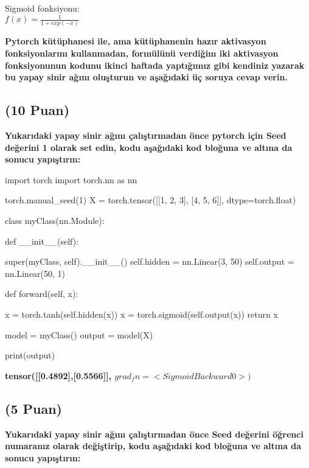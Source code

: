 \documentclass[11pt]{article}
\begin{document}
Sigmoid fonksiyonu:\\
$f(x) = \frac{1}{1 + exp(-x)}$

\vspace{.2in}
 \textbf{Pytorch kütüphanesi ile, ama kütüphanenin hazır aktivasyon fonksiyonlarını kullanmadan, formülünü verdiğim iki aktivasyon fonksiyonunun kodunu ikinci haftada yaptığımız gibi kendiniz yazarak bu yapay sinir ağını oluşturun ve aşağıdaki üç soruya cevap verin.}
 
\subsection{(10 Puan)} \textbf{Yukarıdaki yapay sinir ağını çalıştırmadan önce pytorch için Seed değerini 1 olarak set edin, kodu aşağıdaki kod bloğuna ve altına da sonucu yapıştırın:}

\begin{python}
import torch
import torch.nn as nn

torch.manual_seed(1)
X = torch.tensor([[1, 2, 3], [4, 5, 6]], dtype=torch.float)

class myClass(nn.Module):

    def __init__(self):

        super(myClass, self).__init__()
        self.hidden = nn.Linear(3, 50)
        self.output = nn.Linear(50, 1)

    def forward(self, x):

        x = torch.tanh(self.hidden(x))
        x = torch.sigmoid(self.output(x))
        return x

model = myClass()
output = model(X)

print(output)

\end{python}

\textbf{tensor([[0.4892],[0.5566]], $grad_fn=<SigmoidBackward0>)$}

\subsection{(5 Puan)} \textbf{Yukarıdaki yapay sinir ağını çalıştırmadan önce Seed değerini öğrenci numaranız olarak değiştirip, kodu aşağıdaki kod bloğuna ve altına da sonucu yapıştırın:}
\end{document}
